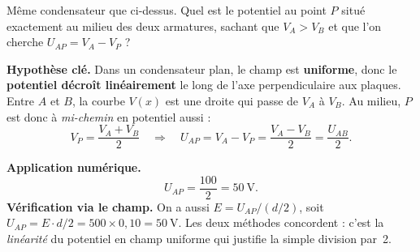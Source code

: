 \documentclass[11pt,a4paper]{article}
\begin{document}
\begin{exemple}
Même condensateur que ci-dessus. Quel est le potentiel au point $P$ situé exactement au milieu des
deux armatures, sachant que $V_A > V_B$ et que l'on cherche $U_{AP} = V_A - V_P$ ?

\textbf{Hypothèse clé.} Dans un condensateur plan, le champ est \textbf{uniforme}, donc le
\textbf{potentiel décroît linéairement} le long de l'axe perpendiculaire aux plaques. Entre $A$ et
$B$, la courbe $V(x)$ est une droite qui passe de $V_A$ à $V_B$. Au milieu, $P$ est donc à
\emph{mi-chemin} en potentiel aussi :
\[ V_P = \frac{V_A + V_B}{2} \quad\Longrightarrow\quad
   U_{AP} = V_A - V_P = \frac{V_A - V_B}{2} = \frac{U_{AB}}{2}. \]

\textbf{Application numérique.}
\[ U_{AP} = \frac{100}{2} = \boxed{\SI{50}{\volt}}. \]
\textbf{Vérification via le champ.} On a aussi $E = U_{AP}/(d/2)$, soit $U_{AP} = E\cdot d/2 =
500\times 0{,}10 = \SI{50}{\volt}$. Les deux méthodes concordent : c'est la \emph{linéarité} du
potentiel en champ uniforme qui justifie la simple division par~2.
\end{exemple}
\end{document}
